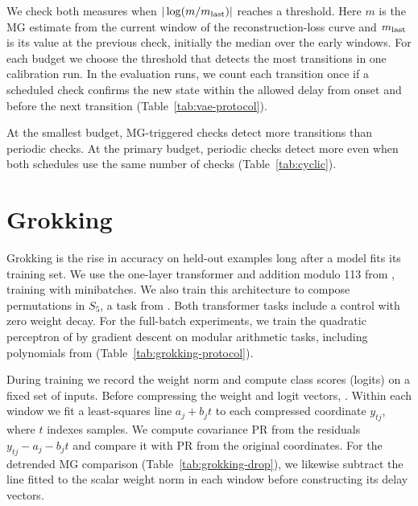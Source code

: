 {We check both measures when $|\log(m/m_{\rm last})|$ reaches a threshold. Here $m$ is the MG estimate from the current window of the reconstruction-loss curve and $m_{\rm last}$ is its value at the previous check, initially the median over the early windows. For each budget we choose the threshold that detects the most transitions in one calibration run. In the evaluation runs, we count each transition once if a scheduled check confirms the new state within the allowed delay from onset and before the next transition (Table~\ref{tab:vae-protocol}).

At the smallest budget, MG-triggered checks detect more transitions than periodic checks. At the primary budget, periodic checks detect more even when both schedules use the same number of checks (Table~\ref{tab:cyclic}).

\begin{table}[!htbp]
\centering\small
\caption{VAE information-loss and recovery events detected out of 41.}
\label{tab:cyclic}

\end{table}

\FloatBarrier
\section[Grokking]{Grokking}\label{app:grokking}
Grokking is the rise in accuracy on held-out examples long after a model fits its training set. We use the one-layer transformer and addition modulo 113 from \citet{nanda2023progress}, training with minibatches. We also train this architecture to compose permutations in $S_5$, a task from \citet{power2022grokking}. Both transformer tasks include a control with zero weight decay. For the full-batch experiments, we train the quadratic perceptron of \citet{gromov2023grokking} by gradient descent on modular arithmetic tasks, including polynomials from \citet{doshi2024grokking} (Table~\ref{tab:grokking-protocol}).

During training we record the weight norm and compute class scores (logits) on a fixed set of inputs. Before compressing the weight and logit vectors, . Within each window we fit a least-squares line $a_j+b_j t$ to each compressed coordinate $y_{tj}$, where $t$ indexes samples. We compute covariance PR from the residuals $y_{tj}-a_j-b_j t$ and compare it with PR from the original coordinates. For the detrended MG comparison (Table~\ref{tab:grokking-drop}), we likewise subtract the line fitted to the scalar weight norm in each window before constructing its delay vectors.

}
